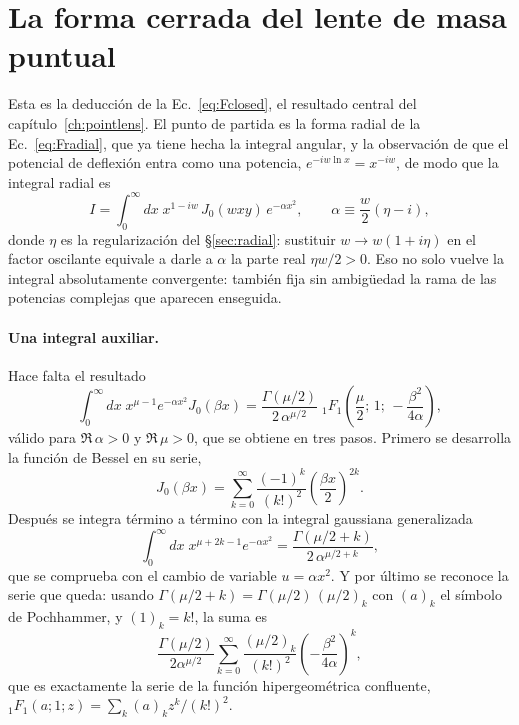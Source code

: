 \documentclass[11pt,a4paper,openany]{book}
\begin{document}
\section{La forma cerrada del lente de masa puntual}
\label{ap:cerrada}

Esta es la deducci\'on de la Ec.~\eqref{eq:Fclosed}, el resultado central del
cap\'itulo~\ref{ch:pointlens}. El punto de partida es la forma radial de la
Ec.~\eqref{eq:Fradial}, que ya tiene hecha la integral angular, y la
observaci\'on de que el potencial de deflexi\'on entra como una potencia,
$e^{-iw\ln x}=x^{-iw}$, de modo que la integral radial es
\begin{equation}
  I=\int_0^{\infty}dx\;x^{1-iw}\,J_0(wxy)\,e^{-\alpha x^{2}},
  \qquad
  \alpha\equiv\frac{w}{2}\left(\eta-i\right) ,
  \label{eq:radial_power}
\end{equation}
donde $\eta$ es la regularizaci\'on del \S\ref{sec:radial}: sustituir
$w\to w(1+i\eta)$ en el factor oscilante equivale a darle a $\alpha$ la parte
real $\eta w/2>0$. Eso no solo vuelve la integral absolutamente convergente:
tambi\'en fija sin ambig\"uedad la rama de las potencias complejas que
aparecen enseguida.

\paragraph{Una integral auxiliar.} Hace falta el resultado
\begin{equation}
  \int_0^{\infty}dx\;x^{\mu-1}e^{-\alpha x^{2}}J_0(\beta x)
  =\frac{\Gamma(\mu/2)}{2\,\alpha^{\mu/2}}\;
  {}_1F_1\!\left(\frac{\mu}{2};\,1;\,-\frac{\beta^{2}}{4\alpha}\right) ,
  \label{eq:weber_sonine}
\end{equation}
v\'alido para $\Re\,\alpha>0$ y $\Re\,\mu>0$, que se obtiene en tres pasos.
Primero se desarrolla la funci\'on de Bessel en su serie,
\begin{equation}
  J_0(\beta x)=\sum_{k=0}^{\infty}\frac{(-1)^{k}}{(k!)^{2}}
  \left(\frac{\beta x}{2}\right)^{2k} .
\end{equation}
Despu\'es se integra t\'ermino a t\'ermino con la integral gaussiana
generalizada
\begin{equation}
  \int_0^{\infty}dx\;x^{\mu+2k-1}e^{-\alpha x^{2}}
  =\frac{\Gamma(\mu/2+k)}{2\,\alpha^{\mu/2+k}} ,
\end{equation}
que se comprueba con el cambio de variable $u=\alpha x^{2}$. Y por \'ultimo se
reconoce la serie que queda: usando $\Gamma(\mu/2+k)=\Gamma(\mu/2)\,(\mu/2)_k$
con $(a)_k$ el s\'imbolo de Pochhammer, y $(1)_k=k!$, la suma es
\begin{equation}
  \frac{\Gamma(\mu/2)}{2\alpha^{\mu/2}}\sum_{k=0}^{\infty}
  \frac{(\mu/2)_k}{(k!)^{2}}\left(-\frac{\beta^{2}}{4\alpha}\right)^{k} ,
\end{equation}
que es exactamente la serie de la funci\'on hipergeom\'etrica confluente,
${}_1F_1(a;1;z)=\sum_k (a)_k z^{k}/(k!)^{2}$.
\end{document}
